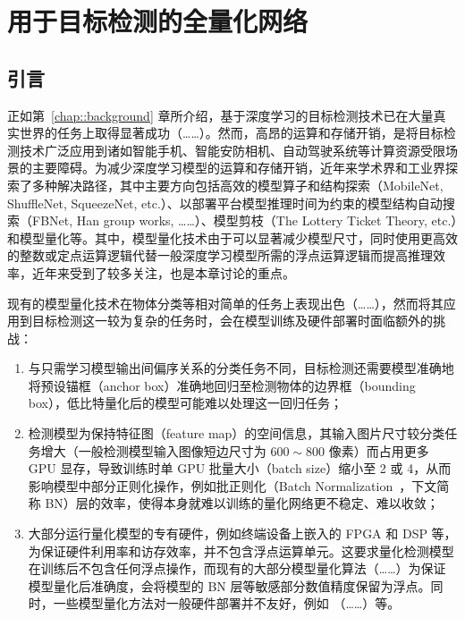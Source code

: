 \chapter{用于目标检测的全量化网络} \label{chap::fqn}
\section{引言}
正如第~\ref{chap::background} 章所介绍，基于深度学习的目标检测技术已在大量真实世界的任务上取得显著成功（……）。然而，高昂的运算和存储开销，是将目标检测技术广泛应用到诸如智能手机、智能安防相机、自动驾驶系统等计算资源受限场景的主要障碍。为减少深度学习模型的运算和存储开销，近年来学术界和工业界探索了多种解决路径，其中主要方向包括高效的模型算子和结构探索（MobileNet, ShuffleNet, SqueezeNet, etc.）、以部署平台模型推理时间为约束的模型结构自动搜索（FBNet, Han group works, ……）、模型剪枝（The Lottery Ticket Theory, etc.）和模型量化等。其中，模型量化技术由于可以显著减少模型尺寸，同时使用更高效的整数或定点运算逻辑代替一般深度学习模型所需的浮点运算逻辑而提高推理效率，近年来受到了较多关注，也是本章讨论的重点。

现有的模型量化技术在物体分类等相对简单的任务上表现出色（……），然而将其应用到目标检测这一较为复杂的任务时，会在模型训练及硬件部署时面临额外的挑战：
\begin{enumerate}[1)]
  \item 与只需学习模型输出间偏序关系的分类任务不同，目标检测还需要模型准确地将预设锚框（anchor box）准确地回归至检测物体的边界框（bounding box），低比特量化后的模型可能难以处理这一回归任务；
  \item 检测模型为保持特征图（feature map）的空间信息，其输入图片尺寸较分类任务增大（一般检测模型输入图像短边尺寸为 $600\sim 800$ 像素）而占用更多 GPU 显存，导致训练时单 GPU 批量大小（batch size）缩小至 2 或 4，从而影响模型中部分正则化操作，例如批正则化（Batch Normalization~\citep{ioffe2015batch}，下文简称 BN）层的效率，使得本身就难以训练的量化网络更不稳定、难以收敛；
  \item 大部分运行量化模型的专有硬件，例如终端设备上嵌入的 FPGA 和 DSP 等，为保证硬件利用率和访存效率，并不包含浮点运算单元。这要求量化检测模型在训练后不包含任何浮点操作，而现有的大部分模型量化算法（……）为保证模型量化后准确度，会将模型的 BN 层等敏感部分数值精度保留为浮点。同时，一些模型量化方法对一般硬件部署并不友好，例如 （……）等。
\end{enumerate}

